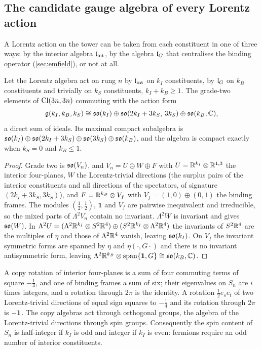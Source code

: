 \subsection{The candidate gauge algebra of every Lorentz action}

A Lorentz action on the tower can be taken from each constituent in one of three ways: by the interior algebra $\mathfrak l_{\rm int}$, by the algebra $\mathfrak l_G$
that centralises the binding operator (\cref{sec:emfield}), or not at all.

\begin{theorem}
\label{thm:algebra}
Let the Lorentz algebra act on rung $n$ by $\mathfrak l_{\rm int}$ on $k_I$ constituents, by $\mathfrak l_G$ on $k_B$ constituents and trivially on $k_S$ constituents,
$k_I+k_B\ge1$. The grade-two elements of $\mathrm{Cl}(3n,3n)$ commuting with the action form
\[
\mathfrak g(k_I,k_B,k_S)\cong\mathfrak{so}(k_I)\oplus\mathfrak{so}(2k_I+3k_S,\,3k_S)\oplus\mathfrak{so}(k_B,\mathbb{C}),
\]
a direct sum of ideals. Its maximal compact subalgebra is $\mathfrak{so}(k_I)\oplus\mathfrak{so}(2k_I+3k_S)\oplus\mathfrak{so}(3k_S)\oplus\mathfrak{so}(k_B)$, and the algebra is
compact exactly when $k_S=0$ and $k_B\le1$.
\end{theorem}

\begin{proof}
Grade two is $\mathfrak{so}(V_n)$, and $V_n=U\oplus W\oplus F$ with $U=\mathbb{R}^{k_I}\otimes\mathbb{R}^{1,3}$ the interior four-planes, $W$ the Lorentz-trivial directions
(the surplus pairs of the interior constituents and all directions of the spectators, of signature $(2k_I+3k_S,3k_S)$), and $F=\mathbb{R}^{k_B}\otimes V_f$ with
$V_f=(1,0)\oplus(0,1)$ the binding frames. The modules $(\tfrac12,\tfrac12)$, $\mathbf1$ and $V_f$ are pairwise inequivalent and irreducible, so
the mixed parts of $\Lambda^2V_n$ contain no invariant. $\Lambda^2W$ is invariant and gives $\mathfrak{so}(W)$. In
$\Lambda^2U=(\Lambda^2\mathbb{R}^{k_I}\otimes S^2\mathbb{R}^4)\oplus(S^2\mathbb{R}^{k_I}\otimes\Lambda^2\mathbb{R}^4)$ the invariants of $S^2\mathbb{R}^4$ are the multiples of $\eta$ and those of
$\Lambda^2\mathbb{R}^4$ vanish, leaving $\mathfrak{so}(k_I)$. On $V_f$ the invariant symmetric forms are spanned by $\eta$ and $\eta(\cdot,G\cdot)$ and there is no invariant
antisymmetric form, leaving $\Lambda^2\mathbb{R}^{k_B}\otimes\operatorname{span}\{\mathbf 1,G\}\cong\mathfrak{so}(k_B,\mathbb{C})$.
\end{proof}

\begin{proposition}
\label{prop:orthospin}
A copy rotation of interior four-planes is a sum of four commuting terms of square $-\tfrac14$, and one of binding frames a sum of six; their eigenvalues
on $S_n$ are $i$ times integers, and a rotation through $2\pi$ is the identity. A rotation $\tfrac12e_se_t$ of two Lorentz-trivial directions of equal
sign squares to $-\tfrac14$ and its rotation through $2\pi$ is $-\mathbf 1$. The copy algebras act through orthogonal groups, the algebra of the Lorentz-trivial
directions through spin groups. Consequently the spin content of $S_n$ is half-integer if $k_I$ is odd and integer if $k_I$ is even: fermions require an
odd number of interior constituents.
\end{proposition}

